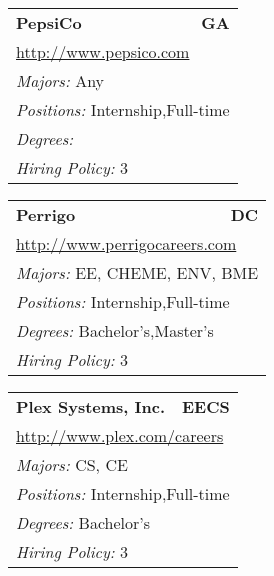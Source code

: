 \documentclass[twoside]{article}
\begin{document}
\begin{center}
\begin{multicols}{3}
\begin{FlushLeft}
\begin{minipage}{\columnwidth}
\end{minipage}
 
\begin{minipage}{\columnwidth}\begin{tabularx}{.95\columnwidth}{Xr}
                 {\Large\bf PepsiCo} & {\Large\bf GA}\\
    \multicolumn{2}{p{.95\columnwidth}}{\url{http://www.pepsico.com}}\\
    \multicolumn{2}{p{.95\columnwidth}}{\emph{Majors:} Any}\\
    \multicolumn{2}{p{.95\columnwidth}}{\emph{Positions:} Internship,Full-time}\\
    \multicolumn{2}{p{.95\columnwidth}}{\emph{Degrees:} }\\
    \multicolumn{2}{p{.95\columnwidth}}{\emph{Hiring Policy:} 3}\\
    \end{tabularx}
    
\end{minipage}
 
\begin{minipage}{\columnwidth}\begin{tabularx}{.95\columnwidth}{Xr}
                 {\Large\bf Perrigo} & {\Large\bf DC}\\
    \multicolumn{2}{p{.95\columnwidth}}{\url{http://www.perrigocareers.com}}\\
    \multicolumn{2}{p{.95\columnwidth}}{\emph{Majors:} EE, CHEME, ENV, BME}\\
    \multicolumn{2}{p{.95\columnwidth}}{\emph{Positions:} Internship,Full-time}\\
    \multicolumn{2}{p{.95\columnwidth}}{\emph{Degrees:} Bachelor's,Master's}\\
    \multicolumn{2}{p{.95\columnwidth}}{\emph{Hiring Policy:} 3}\\
    \end{tabularx}
    
\end{minipage}
 
\begin{minipage}{\columnwidth}\begin{tabularx}{.95\columnwidth}{Xr}
                 {\Large\bf Plex Systems, Inc.} & {\Large\bf EECS}\\
    \multicolumn{2}{p{.95\columnwidth}}{\url{http://www.plex.com/careers}}\\
    \multicolumn{2}{p{.95\columnwidth}}{\emph{Majors:} CS, CE}\\
    \multicolumn{2}{p{.95\columnwidth}}{\emph{Positions:} Internship,Full-time}\\
    \multicolumn{2}{p{.95\columnwidth}}{\emph{Degrees:} Bachelor's}\\
    \multicolumn{2}{p{.95\columnwidth}}{\emph{Hiring Policy:} 3}\\
    \end{tabularx}
    

\end{minipage}
\end{FlushLeft}
\end{multicols}
\end{center}
\end{document}
